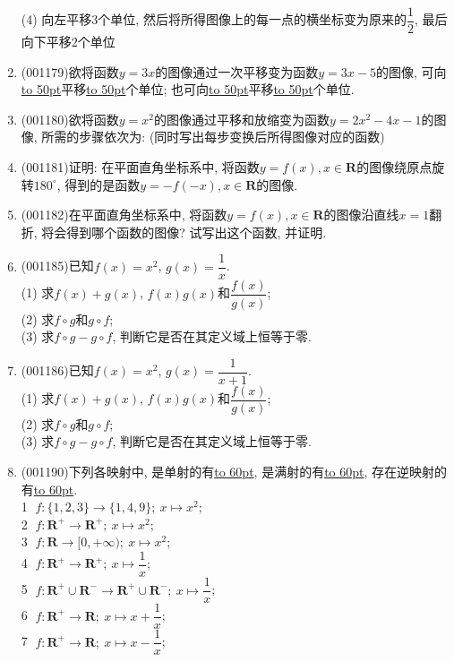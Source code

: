 \documentclass[10pt,a4paper]{article}
\newcommand{\blank}[1]{\underline{\hbox to #1pt{}}}
\begin{document}
\begin{enumerate}[1.]
(4) 向左平移$3$个单位, 然后将所得图像上的每一点的横坐标变为原来的$\dfrac{1}{2}$, 最后向下平移$2$个单位
\item {\tiny (001179)}欲将函数$y=3x$的图像通过一次平移变为函数$y=3x-5$的图像, 可向\blank{50}平移\blank{50}个单位; 也可向\blank{50}平移\blank{50}个单位.
\item {\tiny (001180)}欲将函数$y=x^2$的图像通过平移和放缩变为函数$y=2x^2-4x-1$的图像, 所需的步骤依次为: (同时写出每步变换后所得图像对应的函数)
\item {\tiny (001181)}证明: 在平面直角坐标系中, 将函数$y=f(x),x\in \mathbf{R}$的图像绕原点旋转$180^\circ$, 得到的是函数$y=-f(-x),x\in \mathbf{R}$的图像.
\item {\tiny (001182)}在平面直角坐标系中, 将函数$y=f(x),x\in \mathbf{R}$的图像沿直线$x=1$翻折, 将会得到哪个函数的图像? 试写出这个函数, 并证明.
\item {\tiny (001185)}已知$f(x)=x^2$, $g(x)=\dfrac{1}{x}$.\\ 
(1) 求$f(x)+g(x)$, $f(x)g(x)$和$\dfrac{f(x)}{g(x)}$;\\ 
(2) 求$f\circ g$和$g\circ f$;\\ 
(3) 求$f\circ g-g\circ f$, 判断它是否在其定义域上恒等于零.
\item {\tiny (001186)}已知$f(x)=x^2$, $g(x)=\dfrac{1}{x+1}$.\\ 
(1) 求$f(x)+g(x)$, $f(x)g(x)$和$\dfrac{f(x)}{g(x)}$;\\ 
(2) 求$f\circ g$和$g\circ f$;\\ 
(3) 求$f\circ g-g\circ f$, 判断它是否在其定义域上恒等于零.
\item {\tiny (001190)}下列各映射中, 是单射的有\blank{60}, 是满射的有\blank{60}, 存在逆映射的有\blank{60}.\\ 
\textcircled{1} $f: \{1,2,3\}\rightarrow \{1,4,9\}; \ x\mapsto x^2$;\\ 
\textcircled{2} $f: \mathbf{R}^+\rightarrow \mathbf{R}^+; \ x \mapsto x^2$;\\ 
\textcircled{3} $f: \mathbf{R}\rightarrow [0,+\infty); \ x \mapsto x^2$;\\ 
\textcircled{4} $f: \mathbf{R}^+\rightarrow \mathbf{R}^+; \ x \mapsto \dfrac{1}{x}$;\\ 
\textcircled{5} $f: \mathbf{R}^+\cup \mathbf{R}^-\rightarrow \mathbf{R}^+\cup \mathbf{R}^-; \ x \mapsto \dfrac{1}{x}$;\\ 
\textcircled{6} $f: \mathbf{R}^+\rightarrow \mathbf{R}; \ x \mapsto x+\dfrac{1}{x}$;\\ 
\textcircled{7} $f: \mathbf{R}^+\rightarrow \mathbf{R}; \ x \mapsto x-\dfrac{1}{x}$;\\ 

\end{enumerate}
\end{document}
